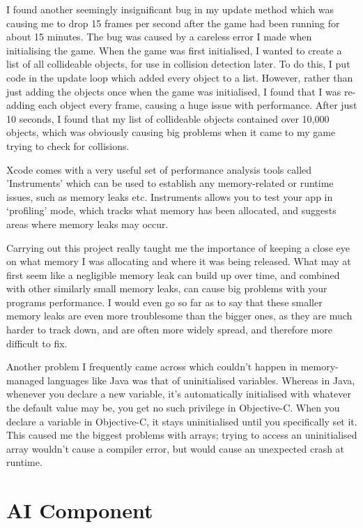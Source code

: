 \documentclass[a4paper,oneside]{report}
\begin{document}
I found another seemingly insignificant bug in my update method which was causing me to drop 15 frames per second after the game had been running for about 15 minutes. The bug was caused by a careless error I made when initialising the game. When the game was first initialised, I wanted to create a list of all collideable objects, for use in collision detection later. To do this, I put code in the update loop which added every object to a list. However, rather than just adding the objects once when the game was initialised, I found that I was re-adding each object every frame, causing a huge issue with performance. After just 10 seconds, I found that my list of collideable objects contained over 10,000 objects, which was obviously causing big problems when it came to my game trying to check for collisions.

Xcode comes with a very useful set of performance analysis tools called 'Instruments' which can be used to establish any memory-related or runtime issues, such as memory leaks etc. Instruments allows you to test your app in `profiling' mode, which tracks what memory has been allocated, and suggests areas where memory leaks may occur.

Carrying out this project really taught me the importance of keeping a close eye on what memory I was allocating and where it was being released. What may at first seem like a negligible memory leak can build up over time, and combined with other similarly small memory leaks, can cause big problems with your programs performance. I would even go so far as to say that these smaller memory leaks are even more troublesome than the bigger ones, as they are much harder to track down, and are often more widely spread, and therefore more difficult to fix.

Another problem I frequently came across which couldn't happen in memory-managed languages like Java was that of uninitialised variables. Whereas in Java, whenever you declare a new variable, it's automatically initialised with whatever the default value may be, you get no such privilege in Objective-C. When you declare a variable in Objective-C, it stays uninitialised until you specifically set it. This caused me the biggest problems with arrays; trying to access an uninitialised array wouldn't cause a compiler error, but would cause an unexpected crash at runtime.

\chapter{AI Component}
\end{document}
